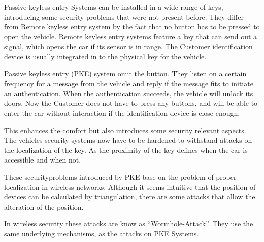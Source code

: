 Passive keyless entry Systems can be installed in a wide range of keys,
introducing some security problems that were not present before.
They differ from Remote keyless entry system by the fact that no
button has to be pressed to open the vehicle.
Remote keyless entry systems feature a key that can send out a signal,
which opens the car if its sensor is in range.
The Customer identification device is usually integrated in to the physical key
for the vehicle.

Passive keyless entry (PKE) system omit the button.
They listen on a certain frequency for a message from the vehicle
and reply if the message fits to initiate an authentication.
When the authentication succeeds, the vehicle will unlock its doors.
Now the Customer does not have to press any buttons,
and will be able to enter the car without interaction 
if the identification device is close enough.

This enhances the comfort but also introduces some security relevant aspects.
The vehicles security systems now have to be hardened
to withstand attacks on the localization of the key.
As the proximity of the key defines when the car is accessible and when not. 

These securityproblems introduced by PKE base on the problem of proper
localization in wireless networks.
Although it seems intuitive that the position of devices can be calculated by
triangulation, there are some attacks that allow the alteration of the position.


In wireless security these attacks are know as ``Wormhole-Attack''.
They use the same underlying mechanisms, as the attacks on PKE Systems.


